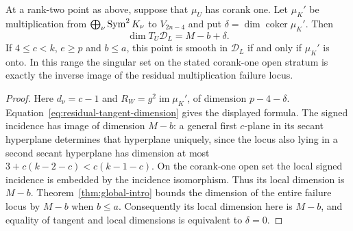 \begin{corollary}
\label{cor:residual-singularity}
At a rank-two point as above, suppose that $\mu_U$ has corank one.
Let $\mu_K'$ be multiplication from $\bigoplus_\nu\operatorname{Sym}^2K_\nu$ to
$V_{2n-4}$ and put $\delta=\dim\operatorname{coker}\mu_K'$.
Then
\begin{equation}\label{eq:rank-two-tangent-excess}
 \dim T_U\mathscr D_L=M-b+\delta.
\end{equation}
If $4\le c<k$, $e\ge p$ and $b\le a$, this point is smooth in
$\mathscr D_L$ if and only if $\mu_K'$ is onto. In this range the
singular set on the stated corank-one open stratum is exactly the inverse
image of the residual multiplication failure locus.
\end{corollary}
\begin{proof}
Here $d_\nu=c-1$ and
$R_W=g^2\operatorname{im}\mu_K'$, of dimension $p-4-\delta$.
Equation~\eqref{eq:residual-tangent-dimension} gives the displayed formula.
The signed incidence has image of dimension $M-b$: a general first
$c$-plane in its secant hyperplane determines that hyperplane uniquely,
since the locus also lying in a second secant hyperplane has dimension
at most $3+c(k-2-c)<c(k-1-c)$. On the corank-one open set the local
signed incidence is embedded by the incidence isomorphism. Thus its
local dimension is $M-b$. Theorem~\ref{thm:global-intro} bounds the
dimension of the entire failure locus by $M-b$ when $b\le a$.
Consequently its local dimension here is $M-b$, and equality of tangent
and local dimensions is equivalent to $\delta=0$.
\end{proof}

